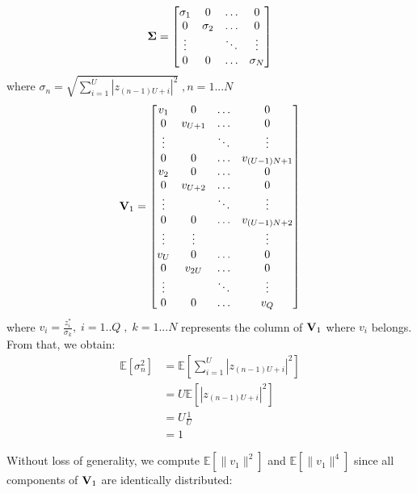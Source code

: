 \begin{equation}
\boldsymbol{\mathrm{\Sigma}} =
\begin{bmatrix}
\sigma_1 & 0 &\hdots & 0 \\
0 & \sigma_2 & \hdots & 0 \\
\vdots &  &\ddots &  \vdots \\
0 & 0 & \hdots & \sigma_N
\end{bmatrix}
\end{equation}
where $\sigma_n = \sqrt{\sum_{i=1}^{U} \left| z_{(n-1)U+i}\right|^2} \; , n = 1...N$
\begin{equation}
\boldsymbol{\mathrm{V}}_1 = 
\begin{bmatrix}
v_1  & 0 & \hdots & 0 \\
0 & v_{U+1} &  \hdots & 0 \\
\vdots & & \ddots &  \vdots \\
0 & 0 & \hdots & v_{(U-1)N+1} \\
v_2 & 0 & \hdots & 0 \\
0  & v_{U+2} & \hdots & 0\\
\vdots & &\ddots &  \vdots\\
0 & 0 & \hdots & v_{(U-1)N+2} \\
\vdots & \vdots & &  \vdots\\	
v_U  & 0 & \hdots & 0 \\
0 & v_{2U} & \hdots & 0 \\
\vdots &  & \ddots & \vdots\\
0 & 0  & \hdots & v_Q
\end{bmatrix}
\end{equation}
where $v_i  = \frac{z_i^*}{\sigma_k}, \; i = 1..Q \; , \; k = 1...N$ represents the column of $\boldsymbol{\mathrm{V}}_1$ where $v_i$ belongs. \\
From that, we obtain:
\begin{subequations}
\begin{align}
\mathbb{E} \left[\sigma_n^2 \right] &= \mathbb{E}\left[ \sum_{i=1}^{U} \left| z_{(n-1)U+i}\right|^2 \right]  \\
& = U \mathbb{E} \left[ \left| z_{(n-1)U+i}\right|^2 \right] \\
&= U \frac{1}{U} \\
& = 1
\end{align}
\end{subequations}

Without loss of generality, we  compute $\mathbb{E} \left[ \| v_1\|^2 \right]$ and $\mathbb{E} \left[ \| v_1\|^4 \right]$ since all components of $\boldsymbol{\mathrm{V}}_1$ are identically distributed:

